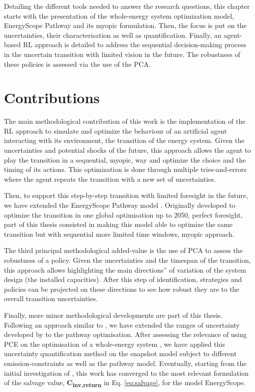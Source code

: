 Detailing the different tools needed to answer the research questions, this chapter starts with the presentation of the whole-energy system optimization model, EnergyScope Pathway and its myopic formulation. Then, the focus is put on the uncertainties, their characterisation as well as quantification. Finally, an agent-based \acrfull{RL} approach is detailed to address the sequential decision-making process in the uncertain transition with limited vision in the future. The robustness of these policies is assessed via the use of the \gls{PCA}.

\section*{Contributions}
\label{sec:meth:contributions}
The main methodological contribution of this work is the implementation of the \gls{RL} approach to simulate and optimize the behaviour of an artificial agent interacting with its environment, \ie the transition of the energy system. Given the uncertainties and potential shocks of the future, this approach allows the agent to play the transition in a sequential, \ie myopic, way and optimize the choice and the timing of its actions. This optimization is done through multiple tries-and-errors where the agent repeats the transition with a new set of uncertainties. 

Then, to support this step-by-step transition with limited foresight in the future, we have extended the EnergyScope Pathway model \cite{limpens2021generating}. Originally developed to optimize the transition in one global optimisation up to 2050, \ie perfect foresight, part of this thesis consisted in making this model able to optimize the same transition but with sequential more limited time windows, \ie myopic approach.

The third principal methodological added-value is the use of \acrfull{PCA} to assess the robustness of a policy. Given the uncertainties and the timespan of the transition, this approach allows highlighting the main \og directions'' of variation of the system design (\ie the installed capacities). After this step of identification, strategies and policies can be projected on these directions to see how robust they are to the overall transition uncertainties.

Finally, more minor methodological developments are part of this thesis. Following an approach similar to \citet{guevara2022modeling}, we have extended the ranges of uncertainty developed by \citet{Moret2017} to the pathway optimisation. After assessing the relevance of using \acrfull{PCE} on the optimisation of a whole-energy system \cite{limpens2020impact}, we have applied this uncertainty quantification method on the snapshot model subject to different emission-constraints \citet{rixhon2021role} as well as the pathway model. Eventually, starting from the initial investigation of \citet{goffauxpathway}, this work has converged to the most relevant formulation of the salvage value, \ie \textbf{C\textsubscript{inv,return}} in Eq. \ref{eq:salvage}, for the model EnergyScope.

